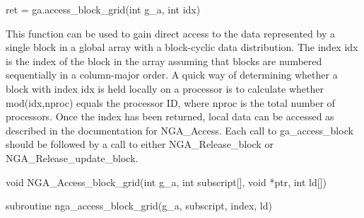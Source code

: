 \documentclass[10pt]{article}
\begin{document}
\begin{pyapi}
\begin{pycode}
ret = ga.access_block_grid(int g_a, int idx)
\end{pycode}
\begin{funcargs}
\end{funcargs}
\end{pyapi}

\local

\begin{desc}

This function can be used to gain direct access to the data represented by a
single block in a global array with a block-cyclic data distribution.  The
index idx is the index of the block in the array assuming that blocks are
numbered sequentially in a column-major order. A quick way of determining
whether a block with index idx is held locally on a processor is to calculate
whether mod(idx,nproc) equals the processor ID, where nproc is the total number
of processors. Once the index has been returned, local data can be accessed as
described in the documentation for NGA_Access. Each call to ga_access_block
should be followed by a call to either NGA_Release_block or
NGA_Release_update_block.

\end{desc}



\begin{capi}
\begin{ccode}
void NGA_Access_block_grid(int g_a, int subscript[], void *ptr, int ld[])
\end{ccode}
\begin{funcargs}
\end{funcargs}
\end{capi}

\begin{fapi}
\begin{fcode}
subroutine nga_access_block_grid(g_a, subscript, index, ld)
\end{fcode}
\begin{funcargs}
\end{funcargs}
\end{fapi}
\end{document}
